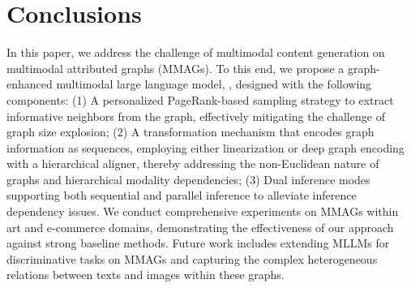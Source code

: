 \section{Conclusions}\label{sec:conclusions}

In this paper, we address the challenge of multimodal content generation on multimodal attributed graphs (MMAGs). 
To this end, we propose a graph-enhanced multimodal large language model, \Ours, designed with the following components:
(1) A personalized PageRank-based sampling strategy to extract informative neighbors from the graph, effectively mitigating the challenge of graph size explosion;
(2) A transformation mechanism that encodes graph information as sequences, employing either linearization or deep graph encoding with a hierarchical aligner, thereby addressing the non-Euclidean nature of graphs and hierarchical modality dependencies;
(3) Dual inference modes supporting both sequential and parallel inference to alleviate inference dependency issues.
We conduct comprehensive experiments on MMAGs within art and e-commerce domains, demonstrating the effectiveness of our approach against strong baseline methods. 
Future work includes extending MLLMs for discriminative tasks on MMAGs and capturing the complex heterogeneous relations between texts and images within these graphs.
